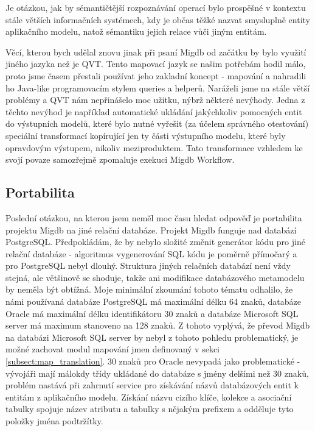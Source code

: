 \documentclass[11pt,twoside,a4paper]{book}
\begin{document}
Je otázkou, jak by sémantičtější rozpoznávání operací bylo prospěšné v
kontextu stále větších informačních systémech, kdy je občas těžké nazvat
smysluplně entity aplikačního modelu, natož sémantiku jejich relace vůči jiným
entitám.

Věcí, kterou bych udělal znovu jinak při psaní Migdb od začátku by bylo využití
jiného jazyka než je QVT. Tento mapovací jazyk se našim potřebám hodil málo,
proto jsme časem přestali používat jeho zakladní koncept - mapování a nahradili
ho Java-like programovacím stylem queries a helperů. Naráželi jsme na stále
větší problémy a QVT nám nepřinášelo moc užitku, nýbrž některé nevýhody. Jedna z
těchto nevýhod je například automatické ukládání jakýchkoliv pomocných entit do
výstupních modelů, které bylo nutné vyřešit (za účelem správného
otestování) speciální transformací kopírující jen ty části výstupního modelu,
které byly opravdovým výstupem, nikoliv meziproduktem. Tato transformace
vzhledem ke svojí povaze samozřejmě zpomaluje exekuci Migdb Workflow.

\subsection{Portabilita}
Poslední otázkou, na kterou jsem neměl moc času hledat odpověď je portabilita
projektu Migdb na jiné relační databáze. Projekt Migdb funguje nad
databází PostgreSQL. Předpokládám, že by nebylo složité změnit generátor kódu
pro jiné relační databáze - algoritmus vygenerování SQL kódu je poměrně
přímočarý a pro PostgreSQL nebyl dlouhý. Struktura jiných relačních databází
není vždy stejná, ale většinově se shoduje, takže ani modifikace databázového
metamodelu by neměla být obtížná. Moje minimální zkoumání tohoto tématu
odhalilo, že námi používaná databáze PostgreSQL má maximální délku 64 znaků,
databáze Oracle má maximální délku identifikátoru 30 znaků a databáze Microsoft
SQL server má maximum stanoveno na 128 znaků. Z tohoto vyplývá, že převod Migdb
na databázi Microsoft SQL server by nebyl  z tohoto pohledu problematický, je
možné zachovat modul mapování jmen definovaný v sekci \ref{subsect:map_translation}.
30 znaků pro Oracle nevypadá jako problematické - vývojáři mají málokdy třídy
ukládané do databáze s jmény delšími než 30 znaků, problém nastává při zahrnutí
service pro získávání názvů databázových entit k entitám z aplikačního modelu.
Získání názvu cizího klíče, kolekce a asociační tabulky spojuje název atributu a
tabulky s nějakým prefixem a odděluje tyto položky jména podtržítky.\\
\end{document}
